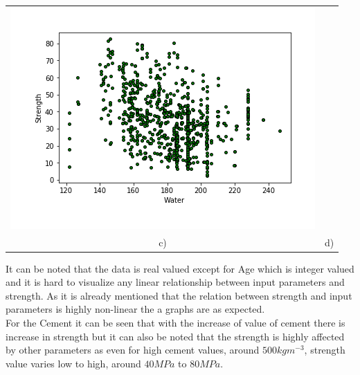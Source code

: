 \begin{center}
\begin{tabular}{cc}
        \includegraphics[scale=0.5]{images/Plot_04.png}\\
        c) & d)\\
    \end{tabular}
\end{center}
It can be noted that the data is real valued except for Age which is integer valued and it is hard to visualize any linear relationship between input parameters and strength. As it is already mentioned that the relation between strength and input parameters is highly non-linear the a graphs are as expected.\\
For the Cement it can be seen that with the increase of value of cement there is increase in strength but it can also be noted that the strength is highly affected by other parameters as even for high cement values, around $500kgm^{-3}$, strength value varies low to high, around $40MPa$ to $80MPa$.
